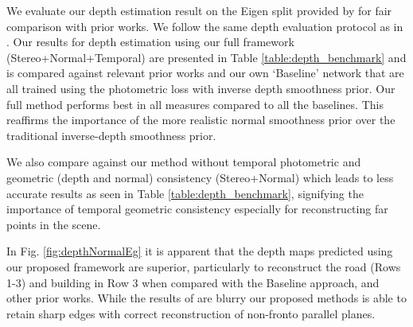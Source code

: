 \documentclass[letterpaper, 10 pt, conference]{ieeeconf}
\begin{document}
We evaluate our depth estimation result on the Eigen split provided by \cite{eigen2014depth} for fair comparison with prior works. We follow the same depth evaluation protocol as in \cite{garg2016depth,godard2016depth}. 
Our results for depth estimation using our full framework (Stereo+Normal+Temporal) are presented in Table \ref{table:depth_benchmark} and is compared against relevant prior works and our own `Baseline' network that are all trained using the photometric loss with inverse depth smoothness prior. Our full method performs best in all measures compared to all the baselines. This reaffirms the importance of the more realistic normal smoothness prior over the traditional inverse-depth smoothness prior.

We also compare against our method without temporal photometric and geometric (depth and normal) consistency (Stereo+Normal) which leads to less accurate results as seen in Table \ref{table:depth_benchmark}, signifying the importance of temporal geometric consistency especially for reconstructing far points in the scene.



In Fig. \ref{fig:depthNormalEg} it is apparent that the depth maps predicted using our proposed framework are superior, particularly to reconstruct the road (Rows 1-3) and building in Row 3 when compared with the Baseline approach, and other prior works. 
While the results of \cite{yang2018lego,yang2017depthnormal} are blurry our proposed methods is able to retain sharp edges with correct reconstruction of non-fronto parallel planes.
\end{document}
